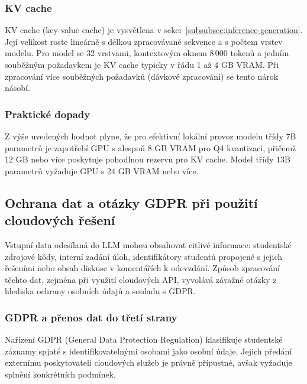 \subsubsection*{KV cache}
\label{subsubsec:kv-cache}

KV cache (key-value cache) je vysvětlena v sekci~\ref{subsubsec:inference-generation}.
Její velikost roste lineárně s délkou zpracovávané sekvence a s počtem vrstev modelu.
Pro model se 32 vrstvami, kontextovým oknem 8\,000 tokenů a jedním souběžným požadavkem je KV cache typicky v řádu 1 až 4 GB VRAM.
Při zpracování více souběžných požadavků (dávkové zpracování) se tento nárok násobí.

\subsubsection*{Praktické dopady}
\label{subsubsec:practical-memory-implications}

Z výše uvedených hodnot plyne, že pro efektivní lokální provoz modelu třídy 7B parametrů je zapotřebí GPU s alespoň 8 GB VRAM pro Q4 kvantizaci, přičemž 12 GB nebo více poskytuje pohodlnou rezervu pro KV cache.
Model třídy 13B parametrů vyžaduje GPU s 24 GB VRAM nebo více.


\subsection{Ochrana dat a otázky GDPR při použití cloudových řešení}
\label{subsec:llm-data-security}

Vstupní data odesílaná do LLM mohou obsahovat citlivé informace: studentské zdrojové kódy, interní zadání úloh, identifikátory studentů propojené s jejich řešeními nebo obsah diskuse v komentářích k odevzdání.
Způsob zpracování těchto dat, zejména při využití cloudových API, vyvolává závažné otázky z hlediska ochrany osobních údajů a souladu s GDPR.

\subsubsection*{GDPR a přenos dat do třetí strany}
\label{subsubsec:gdpr-data-transfer}

Nařízení GDPR (General Data Protection Regulation) klasifikuje studentské záznamy spjaté s identifikovatelnými osobami jako osobní údaje.
Jejich předání externímu poskytovateli cloudových služeb je právně přípustné, avšak vyžaduje splnění konkrétních podmínek.

